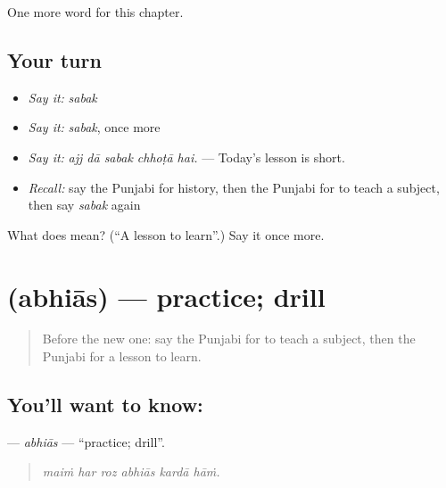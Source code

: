 \begin{grammarlens}[title={What you've built}]
One more word for this chapter.
\end{grammarlens}

\subsection*{Your turn}
\begin{itemize}
\raggedright
  \item \emph{Say it:} \emph{sabak}
  \item \emph{Say it:} \emph{sabak}, once more
  \item \emph{Say it:} \emph{ajj dā sabak chhoṭā hai.} — Today's lesson is short.
  \item \emph{Recall:} say the Punjabi for history, then the Punjabi for to teach a subject, then say \emph{sabak} again
\end{itemize}

\begin{tcolorbox}[breakable,colback=teal!4,colframe=teal!35!black,title={Before you move on}]
What does  mean? (\textquotedblleft{}A lesson to learn\textquotedblright{}.) Say it once more.
\end{tcolorbox}
\section[\texorpdfstring{\pa{ਅਭਿਆਸ} (abhiās)}{ਅਭਿਆਸ (abhiās)}]{ (abhiās) — practice; drill}

\label{lesson:PA-C359-abhias}



\begin{quote}
Before the new one: say the Punjabi for to teach a subject, then the Punjabi for a lesson to learn.
\end{quote}

\subsection*{You'll want to know: }
\textbf{} — \emph{abhiās} — \textquotedblleft{}practice; drill\textquotedblright{}.

\begin{quote}
     
\end{quote}

\begin{quote}
\emph{maiṁ har roz abhiās kardā hāṁ.}
\end{quote}

